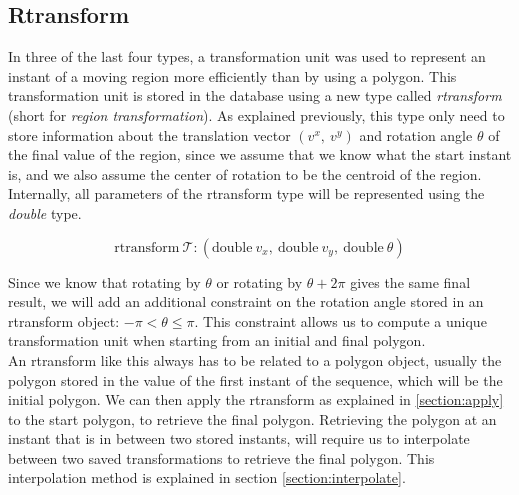 \subsection{Rtransform}

In three of the last four types, a transformation unit was used to represent an instant of a moving region more efficiently than by using a polygon. This transformation unit is stored in the database using a new type called \textit{rtransform} (short for \textit{region transformation}). As explained previously, this type only need to store information about the translation vector $(v^x,\ v^y)$ and rotation angle $\theta$ of the final value of the region, since we assume that we know what the start instant is, and we also assume the center of rotation to be the centroid of the region. Internally, all parameters of the rtransform type will be represented using the \textit{double} type.

\[
    \text{rtransform}\ \mathcal{T}: (\text{double}\ v_x,\ \text{double}\ v_y,\ \text{double}\ \theta)
\]

Since we know that rotating by $\theta$ or rotating by $\theta + 2\pi$ gives the same final result, we will add an additional constraint on the rotation angle stored in an rtransform object: $-\pi < \theta \le \pi$. This constraint allows us to compute a unique transformation unit when starting from an initial and final polygon. \\

An rtransform like this always has to be related to a polygon object, usually the polygon stored in the value of the first instant of the sequence, which will be the initial polygon. We can then apply the rtransform as explained in \ref{section:apply} to the start polygon, to retrieve the final polygon. Retrieving the polygon at an instant that is in between two stored instants, will require us to interpolate between two saved transformations to retrieve the final polygon. This interpolation method is explained in section \ref{section:interpolate}.

